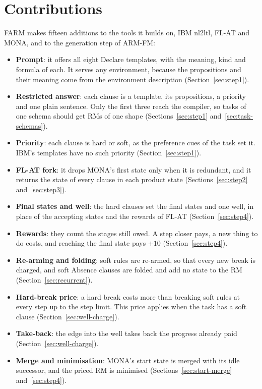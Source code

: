 \documentclass[11pt,english,listoffigures,listoftables]{tfgetsinf}
\newcommand{\gain}[1]{\textcolor{green!40!black}{\bfseries\boldmath #1}}  %
\begin{document}
\section{Contributions}
\label{app:contributions}
FARM makes fifteen additions to the tools it builds on, IBM nl2ltl, FL-AT and MONA, and to the generation step of ARM-FM:
\begin{itemize}
    \item \textbf{Prompt}: it offers all eight Declare templates, with the meaning, kind and formula of each. It serves any environment, because the propositions and their meaning come from the environment description (Section~\ref{sec:step1}).
    \item \textbf{Restricted answer}: each clause is a template, its propositions, a priority and one plain sentence. Only the first three reach the compiler, so tasks of one schema should get RMs of one shape (Sections~\ref{sec:step1} and~\ref{sec:task-schemas}).
    \item \textbf{Priority}: each clause is hard or soft, as the preference cues of the task set it. IBM's templates have no such priority (Section~\ref{sec:step1}).
    \item \textbf{FL-AT fork}: it drops MONA's first state only when it is redundant, and it returns the state of every clause in each product state (Sections~\ref{sec:step2} and~\ref{sec:step3}).
    \item \textbf{Final states and well}: the hard clauses set the final states and one well, in place of the accepting states and the rewards of FL-AT (Section~\ref{sec:step4}).
    \item \textbf{Rewards}: they count the stages still owed. A step closer pays, a new thing to do costs, and reaching the final state pays \gain{$+10$} (Section~\ref{sec:step4}).
    \item \textbf{Re-arming and folding}: soft rules are re-armed, so that every new break is charged, and soft Absence clauses are folded and add no state to the RM (Section~\ref{sec:recurrent}).
    \item \textbf{Hard-break price}: a hard break costs more than breaking soft rules at every step up to the step limit. This price applies when the task has a soft clause (Section~\ref{sec:well-charge}).
    \item \textbf{Take-back}: the edge into the well takes back the progress already paid (Section~\ref{sec:well-charge}).
    \item \textbf{Merge and minimisation}: MONA's start state is merged with its idle successor, and the priced RM is minimised (Sections~\ref{sec:start-merge} and~\ref{sec:step4}).

\end{itemize}
\end{document}
